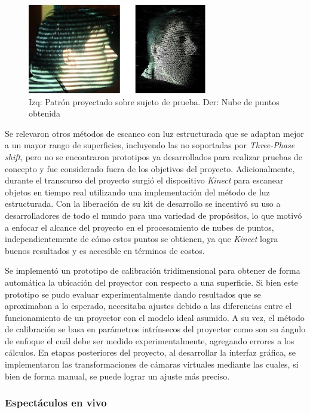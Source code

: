 \begin{figure}[H]
  \centering
    \includegraphics[width=0.7\textwidth]{./Cap7_conclusiones/Phase2.JPG}
  \caption[Imagen propia]{Izq: Patrón proyectado sobre sujeto de prueba. Der: Nube de puntos obtenida}
  \label{fig:cabeza}
\end{figure}

Se relevaron otros métodos de escaneo con luz estructurada que se adaptan mejor a un mayor rango de superficies, incluyendo las no soportadas por \emph{Three-Phase shift}, pero no se encontraron prototipos ya desarrollados para realizar pruebas de concepto y fue considerado fuera de los objetivos del proyecto.
Adicionalmente, durante el transcurso del proyecto surgió el dispositivo \emph{Kinect} para escanear objetos en tiempo real utilizando una implementación del método de luz estructurada. Con la liberación de su kit de desarrollo se incentivó su uso a desarrolladores de todo el mundo para una variedad de propósitos, lo que motivó a enfocar el alcance del proyecto en el procesamiento de nubes de puntos, independientemente de cómo estos puntos se obtienen, ya que \emph{Kinect} logra buenos resultados y es accesible en términos de costos.

Se implementó un prototipo de calibración tridimensional para obtener de forma automática la ubicación del proyector con respecto a una superficie.
Si bien este prototipo se pudo evaluar experimentalmente dando resultados que se aproximaban a lo esperado, necesitaba ajustes debido a las diferencias entre el funcionamiento de un proyector con el modelo ideal asumido. A su vez, el método de calibración se basa en parámetros intrínsecos del proyector como son su ángulo de enfoque el cuál debe ser medido experimentalmente, agregando errores a los cálculos.
En etapas posteriores del proyecto, al desarrollar la interfaz gráfica, se implementaron las transformaciones de cámaras virtuales mediante las cuales, si bien de forma manual, se puede lograr un ajuste más preciso.

\subsubsection{Espectáculos en vivo}

